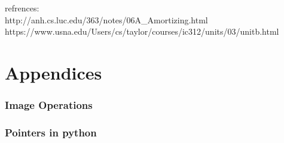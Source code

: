 \documentclass[addpoints]{exam}
\begin{document}
\begin{questions}
\begin{solution}
      refrences:\\
http://anh.cs.luc.edu/363/notes/06A_Amortizing.html\\
https://www.usna.edu/Users/cs/taylor/courses/ic312/units/03/unitb.html\\
    \end{solution}
    
  \end{questions}

  \newpage
\part{Appendices}

  \appendix
  \section{}
  

  \newpage
  \section{}
  

  \newpage
  \section{Image Operations}
  

  \newpage
  \section{Pointers in python}
  
\end{document}
